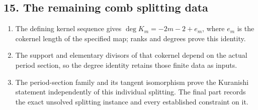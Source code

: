 \subsection*{15. The remaining comb splitting data}
\RungOne
\begin{enumerate}[label=\arabic*.,leftmargin=*]
\item The defining kernel sequence gives
$\deg K_m=-2m-2+e_m$, where $e_m$ is the cokernel length of
the specified map; ranks and degrees prove this identity.
\item The support and elementary divisors of that cokernel
depend on the actual period section, so the degree identity
retains those finite data as inputs.
\item The period-section family and its tangent isomorphism
prove the Kuranishi statement independently of this individual
splitting.  The final part records the exact unsolved splitting
instance and every established constraint on it.
\end{enumerate}
